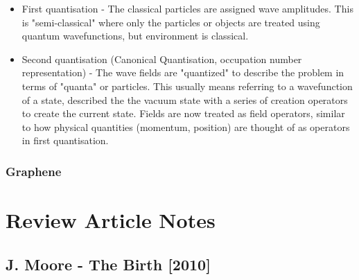 \documentclass{article} %
\begin{document}
\begin{itemize}
	\item First quantisation - The classical particles are assigned wave amplitudes. This is "semi-classical" where only the particles or objects are treated using quantum wavefunctions, but environment is classical. 
	\item Second quantisation (Canonical Quantisation, occupation number representation) - The wave fields are "quantized" to describe the problem in terms of "quanta" or particles. This usually means referring to a wavefunction of a state, described the the vacuum state with a series of creation operators to create the current state.
	Fields are now treated as field operators, similar to how physical quantities (momentum, position) are thought of as operators in first quantisation. 
\end{itemize}

\subsubsection{Graphene}


\section{Review Article Notes}
\subsection{J. Moore - The Birth\cite{moore_birth_2010} [2010]}
\end{document}
